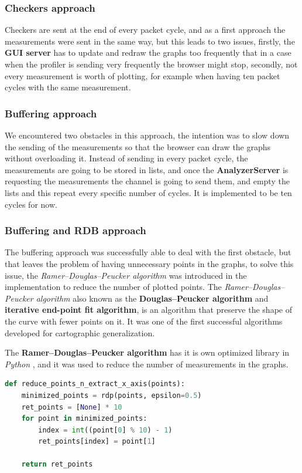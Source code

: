 \subsubsection{Checkers approach}
Checkers are sent at the end of every packet cycle, and as a first approach the measurements were sent
in the same way, but this leads to two issues, firstly, the \textbf{GUI server} has to update and redraw
the graphs too frequently that in a case when the profiler is sending very frequently the browser might
stop, secondly, not every measurement is worth of plotting, for example when having ten packet cycles with
the same measurement.

\subsubsection{Buffering approach}
We encountered two obstacles in this approach, the intention was to slow down the sending of the measurements
so that the browser can draw the graphs without overloading it. Instead of sending in every packet cycle,
the measurements are going to be stored in lists, and once the \textbf{AnalyzerServer} is requesting the measurements
the channel is going to send them, and empty the lists and this repeat every specific number of cycles. It is
implemented to be ten cycles for now.

\subsubsection{Buffering and RDB approach}\label{sec:buffering_rdb}
The buffering approach was successfully able to deal with the first obstacle, but that leaves the problem of
having unnecessary points in the graphs, to solve this issue, the \textit{Ramer–Douglas–Peucker algorithm} was introduced
in the implementation to reduce the number of plotted points. The \textit{Ramer–Douglas–Peucker algorithm}
also known as the \textbf{Douglas–Peucker algorithm} and \textbf{iterative end-point fit algorithm}, 
is an algorithm that preserve the shape of the curve with fewer points on it. 
It was one of the first successful algorithms developed for cartographic generalization. \cite{rdp}

The \textbf{Ramer–Douglas–Peucker algorithm} has it is own optimized library in \textit{Python} \cite{rdp_library},
and it was used to reduce the number of measurements in the graphs.
\newline
\begin{lstlisting}[language=Python, label=code:rdp, caption={Using rdp to reduce points},captionpos=b]
def reduce_points_n_extract_x_axis(points):
    minimized_points = rdp(points, epsilon=0.5)
    ret_points = [None] * 10
    for point in minimized_points:
        index = int((point[0] % 10) - 1)
        ret_points[index] = point[1]

    return ret_points
\end{lstlisting}

